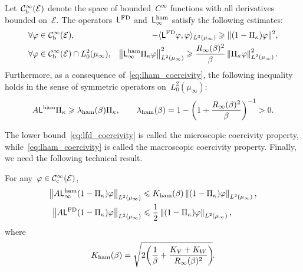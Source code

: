 \documentclass[onefignum,onetabnum]{siamart251216} %
\newcommand{\norm}[1]{\left\lVert#1\right\rVert}
\newcommand{\mc}[1]{\mathcal{#1}}
\renewcommand{\leq}{\leqslant}
\renewcommand{\geq}{\geqslant}
\newcommand{\mescin}{\mu}
\newcommand{\poinccu}{R_{\infty}(\beta)}
\newcommand{\projvit}{\Pi_{\kappa}}
\newcommand{\Lham}{\mathsf{L}^{\rm{ham}}}
\newcommand{\LFD}{\mathsf{L}^{\rm{FD}}}
\newcommand{\norml}[1]{\norm{#1}_{L^2(\mescin_\infty)}}
\newcommand{\lambham}{\lambda_{\rm{ham}}(\beta)}
\newcommand{\kham}{K_{\rm{ham}}(\beta)}
\theoremstyle{plain}
\numberwithin{equation}{section}
\numberwithin{theorem}{section}
\begin{document}
\begin{proposition}
    \label{prop:coercivity_properties}
        Let~$\mc{C}_{\rm b}^\infty(\mc{E})$ denote the space of bounded~$C^\infty$ functions with all derivatives bounded on~$\mc{E}$. The operators~$\LFD$ and~$\Lham_\infty$ satisfy the following estimates:
        \begin{eqnarray}
            \label{eq:lfd_coercivity}
            &\vspace{-0.5cm}\forall \varphi \in \mc{C}_{\rm b}^\infty(\mc{E}),& -\langle \LFD\varphi,\varphi \rangle_{L^2(\mescin_\infty)}\geq \|(1-\projvit )\varphi\|^2, \\
            \label{eq:lham_coercivity}
            &\forall \varphi \in \mc{C}_{\rm b}^\infty(\mc{E})\cap L_0^2(\mescin_\infty),&\norml{\Lham_\infty\projvit \varphi}^2 \geq \frac{\poinccu^2}{\beta}\norml{\projvit \varphi}^2.
        \end{eqnarray}
        Furthermore, as a consequence of~\eqref{eq:lham_coercivity}, the following inequality holds in the sense of symmetric operators on~$L_0^2(\mescin_\infty)$:
        \begin{align}
            \label{eq:lambham}
            A\Lham\projvit \geq \lambham\projvit,\qquad \lambham = 1 - \left(1+\frac{\poinccu^2}{\beta}\right)^{-1}>0.
        \end{align}
\end{proposition}
The lower bound~\eqref{eq:lfd_coercivity} is called the microscopic coercivity property, while~\eqref{eq:lham_coercivity} is called the macroscopic coercivity property.
Finally, we need the following technical result.
\begin{proposition}
    \label{prop:bounded_aux_op}
    For any~$\varphi \in \mc{C}_{\rm c}^\infty(\mc{E})$,
        \begin{align}
            \label{eq:torture}
            \norml{A\Lham_\infty(1-\projvit)\varphi}&\leq \kham \norml{(1-\projvit)\varphi},\\
            \label{eq:A_LFD_1-P}
            \norml{A\LFD(1-\projvit)\varphi}&\leq \frac{1}{2} \norml{(1-\projvit)\varphi},
        \end{align}
        where
        \begin{align}
            \label{eq:Kham}
            \kham = \sqrt{2\!\left(\frac1\beta+\frac{K_V+K_W}{\poinccu^2}\right)\!}.
        \end{align}
    \end{proposition}
\end{document}
